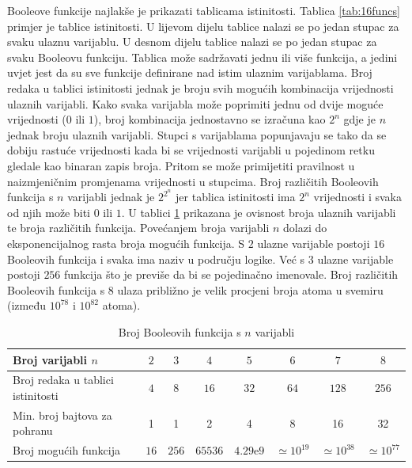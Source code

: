\documentclass[times, utf8, diplomski]{fer}
\begin{document}
Booleove funkcije najlakše je prikazati tablicama istinitosti. Tablica \ref{tab:16funcs} primjer je tablice istinitosti. U lijevom dijelu tablice nalazi se po jedan stupac za svaku ulaznu varijablu. U desnom dijelu tablice nalazi se po jedan stupac za svaku Booleovu funkciju. Tablica može sadržavati jednu ili više funkcija, a jedini uvjet jest da su sve funkcije definirane nad istim ulaznim varijablama. Broj redaka u tablici istinitosti jednak je broju svih mogućih kombinacija vrijednosti ulaznih varijabli. Kako svaka varijabla može poprimiti jednu od dvije moguće vrijednosti ($0$ ili $1$), broj kombinacija jednostavno se izračuna kao $2^{n}$ gdje je $n$ jednak broju ulaznih varijabli. Stupci s varijablama popunjavaju se tako da se dobiju rastuće vrijednosti kada bi se vrijednosti varijabli u pojedinom retku gledale kao binaran zapis broja. Pritom se može primijetiti pravilnost u naizmjeničnim promjenama vrijednosti u stupcima. Broj različitih Booleovih funkcija s $n$ varijabli jednak je $2^{2^{n}}$ jer tablica istinitosti ima $2^{n}$ vrijednosti i svaka od njih može biti $0$ ili $1$. U tablici \ref{tab:broj-Funkcija} prikazana je ovisnost broja ulaznih varijabli te broja različitih funkcija. Povećanjem broja varijabli $n$ dolazi do eksponencijalnog rasta broja mogućih funkcija. S $2$ ulazne varijable postoji $16$ Booleovih funkcija i svaka ima naziv u području logike. Već s $3$ ulazne varijable postoji $256$ funkcija što je previše da bi se pojedinačno imenovale. Broj različitih Booleovih funkcija s $8$ ulaza približno je velik procjeni broja atoma u svemiru (između $10^{78}$ i $10^{82}$ atoma).

\begin{table}[htb]
	\centering
	\caption{Broj Booleovih funkcija s $n$ varijabli}
	\label{tab:broj-Funkcija}
	\begin{tabular}{|l|c|c|c|c|c|c|c|}
		\hline
		Broj varijabli $n$ & $2$ & $3$ & $4$ & $5$ & $6$ & $7$ & $8$ \\ \hline
		Broj redaka u tablici istinitosti & $4$ & $8$ & $16$ & $32$ & $64$ & $128$ & $256$ \\ \hline
		Min. broj bajtova za pohranu & 1 & 1 & 2 & 4 & 8 & 16 & 32 \\ \hline
		Broj mogućih funkcija & $16$ & $256$ & $65536$ & $4.29\mathrm{e}{9}$ & $\simeq 10^{19}$ & $\simeq 10^{38}$ & $\simeq 10^{77}$ \\ \hline
	\end{tabular}
\end{table}
\end{document}
